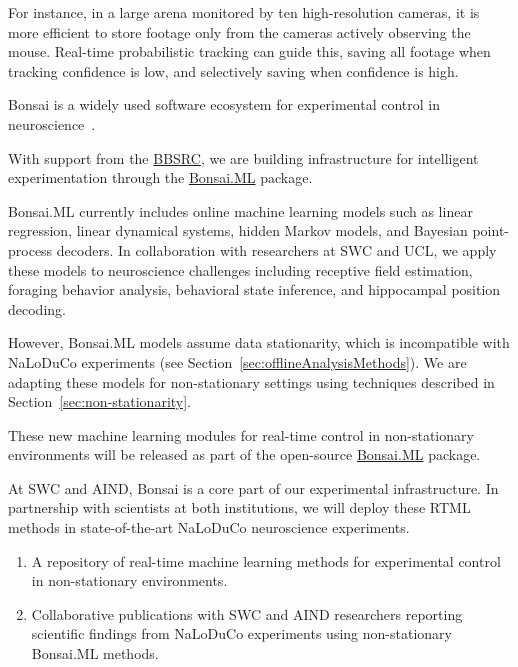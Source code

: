 For instance, in a large arena monitored by ten high-resolution cameras, it is more efficient to store footage only from the cameras actively observing the mouse. Real-time probabilistic tracking can guide this, saving all footage when tracking confidence is low, and selectively saving when confidence is high.


Bonsai is a widely used software ecosystem for experimental control in neuroscience~\citep{lopesEtAl15}.

With support from the \href{https://gow.bbsrc.ukri.org/grants/AwardDetails.aspx?FundingReference=BB\%2FW019132\%2F1}{BBSRC}, we are building infrastructure for intelligent experimentation through the \href{https://bonsai-rx.org/machinelearning/}{Bonsai.ML} package.

Bonsai.ML currently includes online machine learning models such as linear regression, linear dynamical systems, hidden Markov models, and Bayesian point-process decoders. In collaboration with researchers at SWC and UCL, we apply these models to neuroscience challenges including receptive field estimation, foraging behavior analysis, behavioral state inference, and hippocampal position decoding.

However, Bonsai.ML models assume data stationarity, which is incompatible with NaLoDuCo experiments (see Section~\ref{sec:offlineAnalysisMethods}). We are adapting these models for non-stationary settings using techniques described in Section~\ref{sec:non-stationarity}.

These new machine learning modules for real-time control in non-stationary environments will be released as part of the open-source \href{https://bonsai-rx.org/machinelearning/}{Bonsai.ML} package.

At SWC and AIND, Bonsai is a core part of our experimental infrastructure. In partnership with scientists at both institutions, we will deploy these RTML methods in state-of-the-art NaLoDuCo neuroscience experiments.


\begin{enumerate}
    \item A repository of real-time machine learning methods for experimental control in non-stationary environments.
    \item Collaborative publications with SWC and AIND researchers reporting scientific findings from NaLoDuCo experiments using non-stationary Bonsai.ML methods.
\end{enumerate}

